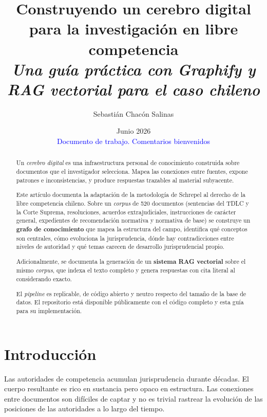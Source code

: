 \documentclass[12pt,a4paper]{article}
\title{%
  \textbf{Construyendo un cerebro digital\\
  para la investigación en libre competencia}\\[0.4em]
  \large\textit{Una guía práctica con Graphify y RAG vectorial para el caso chileno}
}
\author{%
  {Sebastián Chacón Salinas} \\
}
\date{Junio 2026\\[0.5em]
  \small \textcolor{blue}{Documento de trabajo. Comentarios bienvenidos}}
\begin{document}

\maketitle
\thispagestyle{empty}

\begin{abstract}
\noindent
Un \emph{cerebro digital} es una infraestructura personal de conocimiento
construida sobre documentos que el investigador selecciona. Mapea las
conexiones entre fuentes, expone patrones e inconsistencias, y produce respuestas
trazables al material subyacente.

Este artículo documenta la adaptación de la metodología de Schrepel\autocite{schrepel2026brain} al derecho de la libre
competencia chileno. Sobre un \textit{corpus} de 520 documentos (sentencias del TDLC y
la Corte Suprema, resoluciones, acuerdos extrajudiciales, instrucciones de
carácter general, expedientes de recomendación normativa y normativa de base) se
construye un \textbf{grafo de conocimiento} que
mapea la estructura del campo, identifica qué conceptos son centrales, cómo evoluciona la
jurisprudencia, dónde hay contradicciones entre niveles de autoridad y qué temas
carecen de desarrollo jurisprudencial propio. 

Adicionalmente, se documenta la generación de un \textbf{sistema RAG vectorial} sobre el mismo \textit{corpus}, que indexa el texto
completo y genera respuestas con cita literal al considerando exacto.

El \textit{pipeline} es replicable, de código abierto y neutro respecto del tamaño de la base de datos. El repositorio está disponible públicamente con el código completo y esta guía para su implementación.
\end{abstract}

\newpage
\tableofcontents
\newpage

\section{Introducción}

Las autoridades de competencia acumulan jurisprudencia durante décadas. El cuerpo resultante es rico en sustancia pero opaco en estructura. Las conexiones entre documentos son difíciles de captar y no es trivial
rastrear la evolución de las posiciones de las autoridades a lo largo del tiempo.
\end{document}
